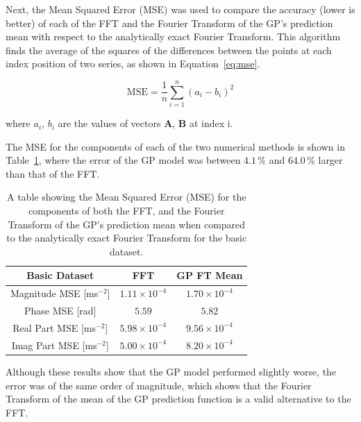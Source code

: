 \documentclass[12pt]{article}
\begin{document}
    Next, the Mean Squared Error (MSE) was used to compare the accuracy (lower is better) of each of the FFT and the Fourier Transform of the GP's prediction mean with respect to the analytically exact Fourier Transform.
    This algorithm finds the average of the squares of the differences between the points at each index position of two series, as shown in Equation~\ref{eq:mse}.

    \begin{equation}
        \text{MSE} = \frac{1}{n} \sum_{i=1}^{n} (a_i - b_i)^2 \label{eq:mse}
    \end{equation}

    \noindent where $a_i$, $b_i$ are the values of vectors $\mathbf{A}$, $\mathbf{B}$ at index i.

    The MSE for the components of each of the two numerical methods is shown in Table~\ref{tab:basic-mse}, where the error of the GP model was between $4.1 \, \%$ and $64.0 \, \%$ larger than that of the FFT.

    \begin{table}[h]
        \centering %
        \setlength{\arrayrulewidth}{1pt} %
        \begin{tabular}{|c|c|c|} %
            \hline
            Basic Dataset & FFT & GP FT Mean \\ %
            \hline
            Magnitude MSE [ms$^{-2}$] & $1.11 \times 10^{-4}$ & $1.70 \times 10^{-4}$ \\ %
            \hline
            Phase MSE [rad] & $5.59$ & $5.82$ \\ %
            \hline
            Real Part MSE [ms$^{-2}$] & $5.98 \times 10^{-4}$ & $9.56 \times 10^{-4}$ \\ %
            \hline
            Imag Part MSE [ms$^{-2}$] & $5.00 \times 10^{-4}$ & $8.20 \times 10^{-4}$ \\ %
            \hline
        \end{tabular}
        \caption{A table showing the Mean Squared Error (MSE) for the components of both the FFT, and the Fourier Transform of the GP's prediction mean when compared to the analytically exact Fourier Transform for the basic dataset.}
        \label{tab:basic-mse}
    \end{table}


    Although these results show that the GP model performed slightly worse, the error was of the same order of magnitude, which shows that the Fourier Transform of the mean of the GP prediction function is a valid alternative to the FFT.
\end{document}
